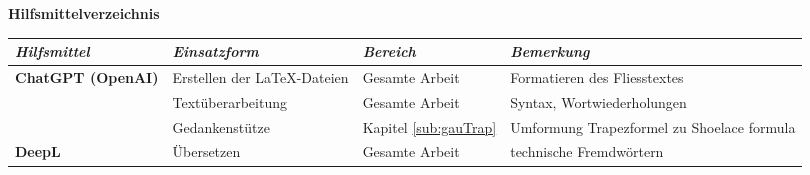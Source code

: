 
\huge\textbf{Hilfsmittelverzeichnis}

\newcommand{\tabTitle}[1]{\textbf{\textit{\large #1}}}
\renewcommand{\arraystretch}{1.5} %

\begin{table}[H]
    \centering
    \begin{tabularx}{\textwidth}{|l|X|X|X|}
        \hline
        \tabTitle{Hilfsmittel} & \tabTitle{Einsatzform} & \tabTitle{Bereich} & \tabTitle{Bemerkung} \\
        \hline

        \textbf{ChatGPT (OpenAI)} & Erstellen der LaTeX-Dateien & Gesamte Arbeit & Formatieren des Fliesstextes \\
         & Textüberarbeitung & Gesamte Arbeit & Syntax, Wortwiederholungen \\ 
         & Gedankenstütze & Kapitel \ref{sub:gauTrap} & Umformung Trapezformel zu Shoelace formula \cite{oai:chatgpt} \\
        \hline
        \textbf{DeepL} & Übersetzen & Gesamte Arbeit & technische Fremdwörtern \\
        \hline
    \end{tabularx}
        \label{tab:tools}
\end{table}

\renewcommand{\arraystretch}{1.0}